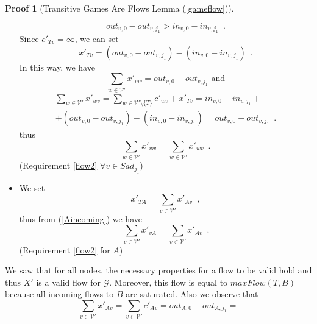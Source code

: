 \documentclass[11pt]{llncs}
\theoremstyle{definition}
\newtheorem{sepproof}{Proof}
\begin{document}
\begin{sepproof}[Transitive Games Are Flows Lemma (\ref{gameflow})]
\begin{itemize}
\begin{equation}
             out_{v, 0} - out_{v, j_1} > in_{v, 0} - in_{v, j_1} \enspace.
          \end{equation}
          Since $c'_{Tv} = \infty$, we can set
          \begin{equation}
             x'_{Tv} = \left(out_{v, 0} - out_{v, j_1}\right) - \left(in_{v, 0} - in_{v, j_1}\right) \enspace.
          \end{equation}
          In this way, we have
          \begin{equation}
             \sum\limits_{w \in \mathcal{V}'}x'_{vw} = out_{v, 0} - out_{v, j_1} \mbox{ and}
          \end{equation}
          \begin{equation}
          \begin{gathered}
             \sum\limits_{w \in \mathcal{V}'}x'_{wv} = \sum\limits_{w \in \mathcal{V}' \setminus \{T\}}c'_{wv} + x'_{Tv} =
             in_{v, 0} - in_{v, j_1} + \\ + (out_{v, 0} - out_{v, j_1}) - (in_{v, 0} - in_{v, j_1}) = out_{v, 0} -
             out_{v, j_1} \enspace.
          \end{gathered}
          \end{equation}
          thus
          \begin{equation}
             \sum\limits_{w \in \mathcal{V}'}x'_{vw} = \sum\limits_{w \in \mathcal{V}'}x'_{wv} \enspace.
          \end{equation}
          (Requirement \ref{flow2} $\forall v \in Sad_{j_1}$)
          \item We set
          \begin{equation}
             x'_{TA} = \sum\limits_{v \in \mathcal{V}'}x'_{Av} \enspace,
          \end{equation}
          thus from (\ref{Aincoming}) we have
          \begin{equation}
             \sum\limits_{v \in \mathcal{V}'}x'_{vA} = \sum\limits_{v \in \mathcal{V}'}x'_{Av} \enspace.
          \end{equation}
          (Requirement \ref{flow2} for $A$)
       \end{itemize}
       We saw that for all nodes, the necessary properties for a flow to be valid hold and thus $X'$ is a valid flow for
       $\mathcal{G}$. Moreover, this flow is equal to $maxFlow(T, B)$ because all incoming flows to $B$ are saturated.
       Also we observe that
       \begin{equation}
       \label{xprimeequalloss}
          \sum\limits_{v \in \mathcal{V}'}x'_{Av} = \sum\limits_{v \in \mathcal{V}'}c'_{Av} = out_{A, 0} - out_{A, j_1} =

\end{equation}
\end{sepproof}
\end{document}
